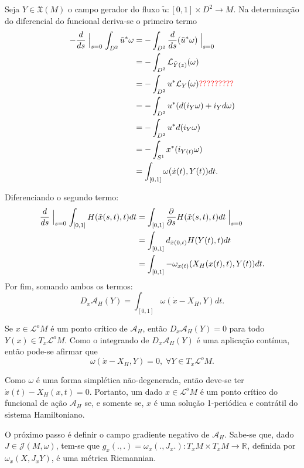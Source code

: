 \documentclass[12pt]{book}
\newcommand{\campohamiltonianoabrev}{X_{H}}
\newcommand{\campossuaves}[1]{\mathfrak{X}(#1)}
\newcommand{\circulo}{S^{1}}
\newcommand{\derivadaparcial}[2]{\frac{\partial #1}{\partial #2}}
\newcommand{\espacotangenteponto}[2]{T_{#1}#2}
\newcommand{\estruturascomplexas}[2]{\mathcal{J}(#1, #2)}
\newcommand{\funcionalH}{\mathcal{A}_{H}}
\newcommand{\intervalo}{[0,1]}
\newcommand{\real}[1]{\mathbb{R}^{#1}}
\newcommand{\reta}{\real{}}
\newcommand{\lacocontrateis}{\mathcal{L}^{o}M}
\newcommand{\alerta}[1]{{\color{red}#1}}
\begin{document}
	Seja $Y\in \campossuaves{M}$ o campo gerador do fluxo $\tilde{u}:\intervalo\times D^{2}\to M$. Na determinação do diferencial do funcional deriva-se o primeiro termo
	$$
	\begin{aligned}
	-\frac{d}{ds} \Bigm\lvert_{s=0} \int_{D^{2}}\tilde{u}^{*}\omega 
	&=-\int_{D^{2}}\frac{d}{ds} (\tilde{u}^{*}\omega)\Bigm\lvert_{s=0} \\
	&=-\int_{D^{2}} \mathcal{L}_{\tilde{Y}(z)}(\omega)
	\\
	&=-\int_{D^{2}}u^{*} \mathcal{L}_{Y}(\omega)\alerta{?????????}
	\\
	&=-\int_{D^{2}}u^{*} (d(i_{Y}\omega) + i_{Y}d\omega)
	\\
	&=-\int_{D^{2}}u^{*} d(i_{Y}\omega)
	\\
	&=-\int_{\circulo}	x^{*} (i_{Y(t)}\omega)
	\\
	&= \int_{[0,1]} \omega(\dot{x}(t), Y(t))dt.
	\end{aligned}
	$$
	
	Diferenciando o segundo termo:
	$$
	\begin{aligned}
	\frac{d}{ds} \Bigm\lvert_{s=0} \int_{[0,1]} H(\tilde{x}(s,t),t)dt 
	&= \int_{[0,1]} \derivadaparcial{}{s} H(\tilde{x}(s,t),t)dt \Bigm\lvert_{s=0}
	\\
	&= \int_{[0,1]} d_{\tilde{x}(0,t)}H(Y(t),t)dt
	\\
	&= \int_{[0,1]} -\omega_{x(t)}(\campohamiltonianoabrev(x(t), t), Y(t))dt. 
	\end{aligned}
	$$
	Por fim, somando ambos os termos:
	$$
	D_{x}\funcionalH(Y) = \int_{[0,1]} \omega(\dot{x} - \campohamiltonianoabrev, Y)dt.
	$$
	
	Se $x \in \lacocontrateis$ é um ponto crítico de $\funcionalH$, então $D_{x}\funcionalH(Y) = 0 $ para todo $Y(x) \in \espacotangenteponto{x}{\lacocontrateis}$. Como o integrando de $D_{x}\funcionalH(Y)$ é uma aplicação contínua, então pode-se afirmar que
	$$
	\omega(\dot{x} - \campohamiltonianoabrev, Y)=0,\; \forall Y \in \espacotangenteponto{x}{\lacocontrateis}.
	$$
	
	Como $\omega$  é uma forma simplética não-degenerada, então deve-se ter $\dot{x}(t) - \campohamiltonianoabrev(x, t)=0$. Portanto, um dado $x \in \lacocontrateis$ é um ponto crítico do funcional de ação $\funcionalH$ se, e somente se, $x$ é uma solução 1-periódica e contrátil do sistema Hamiltoniano.
	
	O próximo passo é definir o campo gradiente negativo de $\funcionalH$. Sabe-se que, dado $J \in \estruturascomplexas{M}{\omega}$, tem-se que $g_{x}(., .)=\omega_{x}(.,J_{x}.):T_{x}M\times T_{x}M \to \reta$, definida por $\omega_{x}(X,J_{x}Y)$, é uma métrica Riemannian.
	
\end{document}
